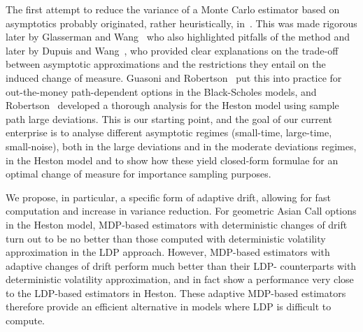 \documentclass{amsart}[11pt]
\numberwithin{equation}{section}
\numberwithin{theorem}{subsection}
\numberwithin{proposition}{subsection}
\numberwithin{definition}{subsection}
\numberwithin{lemma}{subsection}
\numberwithin{assumption}{subsection}
\begin{document}
The first attempt to reduce the variance of a Monte Carlo estimator based on asymptotics probably originated, rather heuristically, in~\cite{Siegmund1976}. 
This was made rigorous later by Glasserman and Wang~\cite{Glasserman1997} who also highlighted pitfalls of the method and later by Dupuis and Wang~\cite{dupuis2004importance}, who provided clear explanations on the trade-off between asymptotic approximations and the restrictions they entail on the induced change of measure.
Guasoni and Robertson~\cite{Guasoni2007} 
put this into practice for out-the-money path-dependent options in the Black-Scholes models, 
and Robertson~\cite{Robertson2010} developed a thorough analysis for the Heston model using sample path large deviations.
This is our starting point,
and the goal of our current enterprise is to analyse different asymptotic regimes 
(small-time, large-time, small-noise),
both in the large deviations and in the moderate deviations regimes, in the Heston model 
and to show how these yield closed-form formulae for an optimal change of measure for importance sampling purposes.

We propose, in particular, a specific form of adaptive drift, allowing for fast computation
and increase in variance reduction.
For  geometric Asian Call options in the Heston model, MDP-based estimators with deterministic changes of drift turn out to be no better than those computed with deterministic volatility approximation in the LDP approach. 
However, MDP-based estimators with adaptive changes of drift perform much better than their LDP- counterparts with deterministic volatility approximation, 
and in fact show a performance very close to the LDP-based estimators in Heston. 
These adaptive MDP-based estimators therefore provide an efficient alternative in models where 
LDP is difficult to compute.
\end{document}
